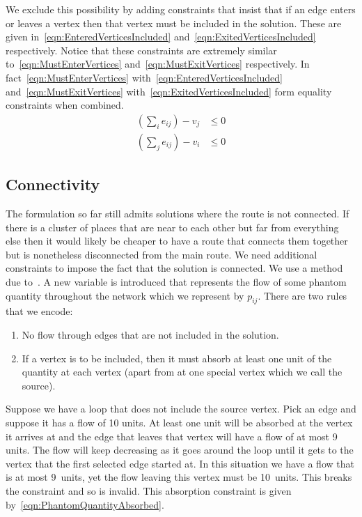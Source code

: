 We exclude this possibility by adding constraints that insist that if an edge enters or leaves a vertex then that vertex must be included in the solution. These are given in~\eqref{eqn:EnteredVerticesIncluded} and~\eqref{eqn:ExitedVerticesIncluded} respectively. Notice that these constraints are extremely similar to~\eqref{eqn:MustEnterVertices} and~\eqref{eqn:MustExitVertices} respectively. In fact~\eqref{eqn:MustEnterVertices} with~\eqref{eqn:EnteredVerticesIncluded} and~\eqref{eqn:MustExitVertices} with~\eqref{eqn:ExitedVerticesIncluded} form equality constraints when combined.
\begin{subequations}
	\begin{align}
		\left( \sum_i e_{ij} \right) - v_j &\le 0
		\label{eqn:EnteredVerticesIncluded} \\
		\left( \sum_j e_{ij} \right) - v_i &\le 0
		\label{eqn:ExitedVerticesIncluded}
	\end{align}
\end{subequations}

\subsection{Connectivity}
\label{sec:Connectivity}

The formulation so far still admits solutions where the route is not connected. If there is a cluster of places that are near to each other but far from everything else then it would likely be cheaper to have a route that connects them together but is nonetheless disconnected from the main route. We need additional constraints to impose the fact that the solution is connected. We use a method due to~\cite{GraphConnectivity}. A new variable is introduced that represents the flow of some phantom quantity throughout the network which we represent by $p_{ij}$. There are two rules that we encode:

\begin{enumerate}
	\item No flow through edges that are not included in the solution.
	\item If a vertex is to be included, then it must absorb at least one unit of the quantity at each vertex (apart from at one special vertex which we call the source).
\end{enumerate}

Suppose we have a loop that does not include the source vertex. Pick an edge and suppose it has a flow of 10 units. At least one unit will be absorbed at the vertex it arrives at and the edge that leaves that vertex will have a flow of at most 9 units. The flow will keep decreasing as it goes around the loop until it gets to the vertex that the first selected edge started at. In this situation we have a flow that is at most 9~units, yet the flow leaving this vertex must be 10~units. This breaks the constraint and so is invalid. This absorption constraint is given by~\eqref{eqn:PhantomQuantityAbsorbed}.

